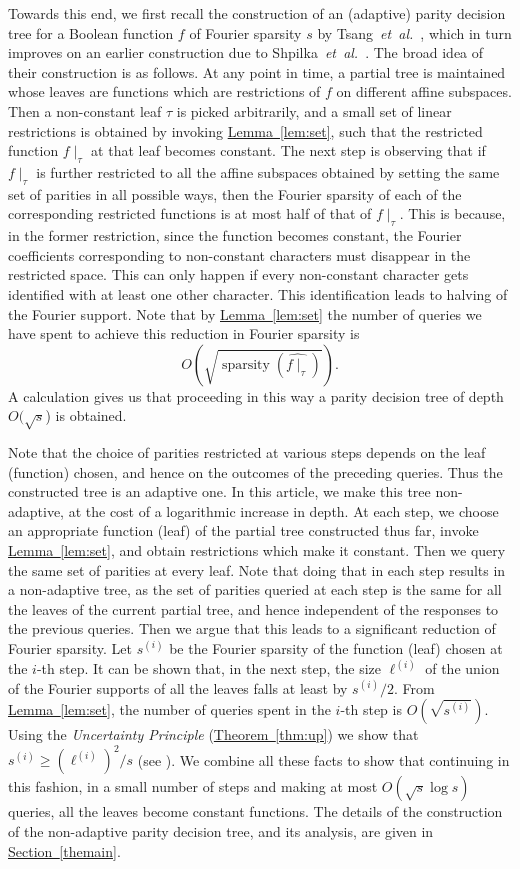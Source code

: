 \documentclass{toc}
\DeclareMathOperator{\spa}{sparsity}
\newcommand{\etal}{{\it et~al.}}
\newcommand{\lref}[2][]{\hyperref[#2]{#1~\ref*{#2}}}
\begin{document}
Towards this end, we first recall the construction of an
(adaptive) parity decision tree for a Boolean function $f$ of Fourier sparsity $s$ by Tsang~\etal~\cite{tsang}, which in
turn improves on an earlier construction due to 
Shpilka~\etal~\cite[Theorem~1.1]{DBLP:conf/innovations/ShpilkaTV14}.
The broad idea of their
construction is as follows. %
At any point in time, a partial
tree is maintained whose leaves are functions which are restrictions of $f$ on different affine subspaces. Then a non-constant
leaf $\tau$ is picked arbitrarily, and a small set
of linear restrictions is obtained by invoking \lref[Lemma]{lem:set}, such that the restricted function $f\mid_\tau$ at that leaf becomes
constant. The next step is observing that if $f\mid_\tau$ is further restricted to
all the affine subspaces obtained by setting the same set of 
parities in all possible ways, then the Fourier sparsity of each of the corresponding restricted functions
is at most half of that of $f\mid_\tau$. This is because, in
the former restriction, since the function becomes constant, the
Fourier coefficients corresponding to non-constant characters must
disappear in the restricted space. This can only happen if every
non-constant character gets identified with at least one
other character. This identification leads to halving of the Fourier
support. Note that by \lref[Lemma]{lem:set} the number of queries we have spent to achieve this reduction in Fourier sparsity is
\[
  O\left(\sqrt{\spa(\widehat{f\mid_\tau})}\right).
\]
A calculation gives us that proceeding in this way a parity decision tree
of depth $O(\sqrt{s}$) is obtained. 


Note that the choice of parities restricted at various steps depends on the leaf (function)
chosen, and hence on the outcomes of the preceding queries. Thus the
constructed tree is an adaptive one. In this article, we make this
tree non-adaptive, at the cost of a logarithmic increase in depth. At each
step, we choose an appropriate function (leaf) of the partial tree constructed thus far, invoke
\lref[Lemma]{lem:set}, and obtain restrictions which make it
constant. Then we query the same set of parities at every
leaf. Note that doing that in each step results in a non-adaptive tree, as the set of parities
queried at each step is the same for all the leaves of the current partial tree, and hence independent of the responses to the previous queries. Then we argue that this leads to a significant
reduction of Fourier sparsity. 
Let $s^{(i)}$ be the Fourier sparsity of the function (leaf)
chosen at the $i$-th step. It can be shown that, in the next step, 
the size $\ell^{(i)}$ of the union of the Fourier supports of all the leaves falls at least
by $s^{(i)}/2$. {}From \lref[Lemma]{lem:set}, the number of queries
spent in the $i$-th step is $O(\sqrt{s^{(i)}})$. Using the
\emph{Uncertainty Principle} (\lref[Theorem]{thm:up}) we show that 
$s^{(i)} \geq \left(\ell^{(i)}\right)^2/s$ (see ). We combine all these facts to show that continuing in
this fashion, in a small number of steps and making at most $O(\sqrt{s} \log s)$
queries, all the leaves become constant functions. The details of the construction of the
non-adaptive parity decision tree, and its analysis, are given in \lref[Section]{themain}.
\end{document}
